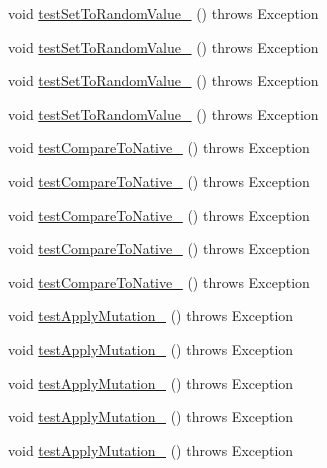 \begin{DoxyCompactItemize}
void \hyperlink{classorg_1_1jgap_1_1impl_1_1_double_gene_test_a873f6318efa75c8ac5f32df7a6afedd0}{test\-Set\-To\-Random\-Value\-\_} ()  throws Exception 
\item 
void \hyperlink{classorg_1_1jgap_1_1impl_1_1_double_gene_test_a6e78c6ca74eb86d0d457a7c10c05c999}{test\-Set\-To\-Random\-Value\-\_} ()  throws Exception 
\item 
void \hyperlink{classorg_1_1jgap_1_1impl_1_1_double_gene_test_aed0830787086b2aad8b0cd18e6becacd}{test\-Set\-To\-Random\-Value\-\_} ()  throws Exception 
\item 
void \hyperlink{classorg_1_1jgap_1_1impl_1_1_double_gene_test_ab12015b0af5317353074156ee3a94224}{test\-Set\-To\-Random\-Value\-\_} ()  throws Exception 
\item 
void \hyperlink{classorg_1_1jgap_1_1impl_1_1_double_gene_test_a429e3fd06bbdf213d8aa5c9f0cca2ade}{test\-Compare\-To\-Native\-\_} ()  throws Exception 
\item 
void \hyperlink{classorg_1_1jgap_1_1impl_1_1_double_gene_test_a47cb3ecaac9abd7e3b49b900bb436e11}{test\-Compare\-To\-Native\-\_} ()  throws Exception 
\item 
void \hyperlink{classorg_1_1jgap_1_1impl_1_1_double_gene_test_a4d6da3b9788ffad15d4e32bcafe0c698}{test\-Compare\-To\-Native\-\_} ()  throws Exception 
\item 
void \hyperlink{classorg_1_1jgap_1_1impl_1_1_double_gene_test_ac42475019d5bb04cb8a6648e790e7254}{test\-Compare\-To\-Native\-\_} ()  throws Exception 
\item 
void \hyperlink{classorg_1_1jgap_1_1impl_1_1_double_gene_test_abfecef5adc2bc846e768483df3945eab}{test\-Compare\-To\-Native\-\_} ()  throws Exception 
\item 
void \hyperlink{classorg_1_1jgap_1_1impl_1_1_double_gene_test_ab562980244f71d28c752654f451889c0}{test\-Apply\-Mutation\-\_} ()  throws Exception 
\item 
void \hyperlink{classorg_1_1jgap_1_1impl_1_1_double_gene_test_a70983f03b2b37d4af65a8fc35bb2109b}{test\-Apply\-Mutation\-\_} ()  throws Exception 
\item 
void \hyperlink{classorg_1_1jgap_1_1impl_1_1_double_gene_test_a4c639273d9c7b4388f2fb5f35964a657}{test\-Apply\-Mutation\-\_} ()  throws Exception 
\item 
void \hyperlink{classorg_1_1jgap_1_1impl_1_1_double_gene_test_a863a1666c22731733f95fb98d67d5d6d}{test\-Apply\-Mutation\-\_} ()  throws Exception 
\item 
void \hyperlink{classorg_1_1jgap_1_1impl_1_1_double_gene_test_a0c2528a50c10a48bbded079359f30bc7}{test\-Apply\-Mutation\-\_} ()  throws Exception 

\end{DoxyCompactItemize}
